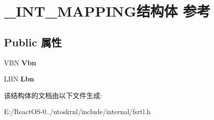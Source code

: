 \hypertarget{struct___i_n_t___m_a_p_p_i_n_g}{}\section{\+\_\+\+I\+N\+T\+\_\+\+M\+A\+P\+P\+I\+N\+G结构体 参考}
\label{struct___i_n_t___m_a_p_p_i_n_g}
\subsection*{Public 属性}
\begin{DoxyCompactItemize}
\item 
\mbox{\label{struct___i_n_t___m_a_p_p_i_n_g_affa66db5408f830c452f851ac4685917}} 
V\+BN {\bfseries Vbn}
\item 
\mbox{\label{struct___i_n_t___m_a_p_p_i_n_g_a18da6de9431aaf16728cf3cee29b0b0d}} 
L\+BN {\bfseries Lbn}
\end{DoxyCompactItemize}


该结构体的文档由以下文件生成\+:\begin{DoxyCompactItemize}
\item 
E\+:/\+React\+O\+S-\/0../ntoskrnl/include/internal/fsrtl.\+h\end{DoxyCompactItemize}
